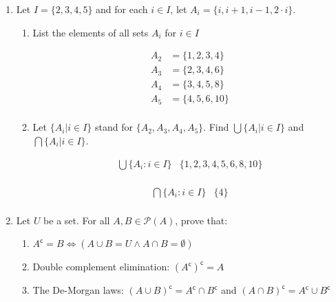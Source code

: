 \documentclass[10pt,\jkfside,a4paper]{article}
\begin{document}
\begin{enumerate}
\item Let $I = \{2, 3, 4, 5\}$ and for each $i \in I$, let $A_i = \{i, i + 1, i - 1, 2\cdot i\}$.

\begin{enumerate}

\item List the elements of all sets $A_i$ for $i \in I$

\begin{equation}
\begin{split}
A_2 &= \{1, 2, 3, 4\}\\
A_3 &= \{2, 3, 4, 6\}\\
A_4 &= \{3, 4, 5, 8\}\\
A_5 &= \{4, 5, 6, 10\}\\
\end{split}
\end{equation}

\item Let $\{A_i| i \in I\}$ stand for $\{A_2, A_3, A_4, A_5\}$. Find $\bigcup\{A_i| i \in I\}$ and $\bigcap\{A_i| i \in I\}$.

\begin{equation}
\begin{split}
\bigcup\{A_i: i \in I\}&\{1, 2, 3, 4, 5, 6, 8, 10\}\\
\end{split}
\end{equation}

\begin{equation}
\begin{split}
\bigcap\{A_i:i \in I\}&\{4\}\\
\end{split}
\end{equation}

\end{enumerate}

\item Let $U$ be a set. For all $A, B \in \mathcal{P}(A)$, prove that:

\begin{enumerate}

\item $A^\mathsf{c} = B \Longleftrightarrow (A \cup B = U \wedge A \cap B = \emptyset)$



\item Double complement elimination: $(A^\mathsf{c})^\mathsf{c} = A$



\item The De-Morgan laws: $(A \cup B)^\mathsf{c} = A^\mathsf{c} \cap B^\mathsf{c}$ and $(A \cap B)^\mathsf{c} = A^\mathsf{c}\cup B^\mathsf{c}$



\end{enumerate}

\end{enumerate}
\end{document}
